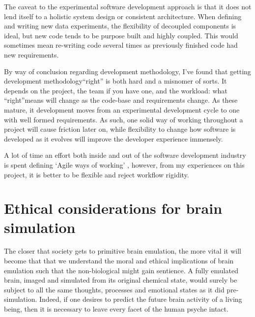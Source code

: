 The caveat to the experimental software development approach is that it does not
lend itself to a holistic system design or consistent architecture. When
defining and writing new data experiments, the flexibility of decoupled
components is ideal, but new code tends to be purpose built and highly coupled.
This would sometimes mean re-writing code several times as previously finished
code had new requirements.

By way of conclusion regarding development methodology, I’ve found that getting
development methodology“right” is both hard and a misnomer of sorts. It depends
on the project, the team if you have one, and the workload: what “right”means
will change as the code-base and requirements change. As these mature, it
development moves from an experimental development cycle to one with well formed
requirements. As such, one solid way of working throughout a project will cause
friction later on, while flexibility to change how software is developed as it
evolves will improve the developer experience immensely.

A lot of time an effort both inside and out of the software development industry
is spent defining `Agile ways of working' \autocite{spolsky_you_2006}, however,
from my experiences on this project, it is better to be flexible and reject
workflow rigidity.



\section{Ethical considerations for brain simulation}

The closer that society gets to primitive brain emulation, the more vital it
will become that that we understand the moral and ethical implications of brain
emulation such that the non-biological might gain sentience. A fully emulated
brain, imaged and simulated from its original chemical state, would surely be
subject to all the same thoughts, processes and emotional states as it did
pre-simulation. Indeed, if one desires to predict the future brain activity of a
living being, then it is necessary to leave every facet of the human psyche intact.


